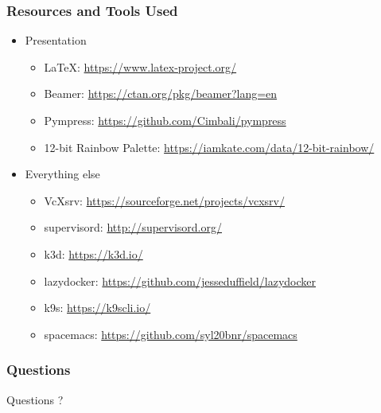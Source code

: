     \begin{frame}
      \frametitle{Resources and Tools Used}
      \begin{itemize}
      \item Presentation
        \begin{itemize}
        \item \LaTeX:
          \href{https://www.latex-project.org/}{https://www.latex-project.org/}
        \item Beamer:
          \href{https://ctan.org/pkg/beamer?lang=en}{https://ctan.org/pkg/beamer?lang=en}
        \item Pympress:
          \href{https://github.com/Cimbali/pympress}{https://github.com/Cimbali/pympress}
        \item 12-bit Rainbow Palette:
          \href{https://iamkate.com/data/12-bit-rainbow/}{https://iamkate.com/data/12-bit-rainbow/}
        \end{itemize}
      \item Everything else
        \begin{itemize}
        \item VcXsrv:
          \href{https://sourceforge.net/projects/vcxsrv/}{https://sourceforge.net/projects/vcxsrv/}
        \item supervisord:
          \href{http://supervisord.org/}{http://supervisord.org/}
        \item k3d:
          \href{https://k3d.io/}{https://k3d.io/}
        \item lazydocker:
          \href{https://github.com/jesseduffield/lazydocker}{https://github.com/jesseduffield/lazydocker}
        \item k9s:
          \href{https://k9scli.io/}{https://k9scli.io/}
        \item spacemacs:
          \href{https://github.com/syl20bnr/spacemacs}{https://github.com/syl20bnr/spacemacs}
        \end{itemize}
      \end{itemize}
    \end{frame}

    \begin{frame}
      \frametitle{Questions}
      \begin{center}
        {\Huge Questions ?}
      \end{center}
    \end{frame}


